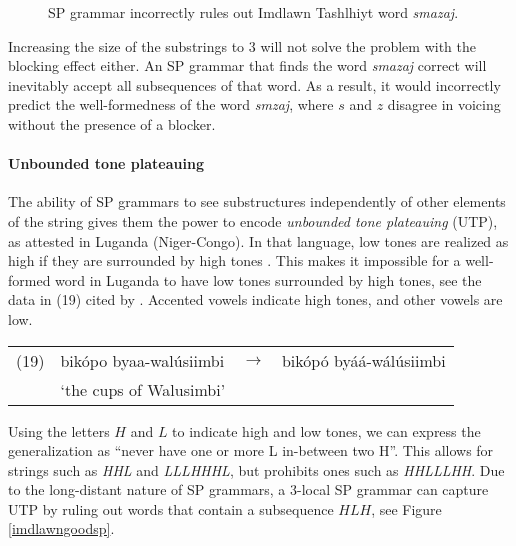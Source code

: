\begin{figure}[h!]
\begin{center}
\end{center}
\caption{SP grammar incorrectly rules out Imdlawn Tashlhiyt word \emph{sm\textchi azaj}.}
\label{imdlawnbadsp}
\end{figure}

Increasing the size of the substrings to $3$ will not solve the problem with the blocking effect either.
An SP grammar that finds the word \emph{sm\textchi azaj} correct will inevitably accept all subsequences of that word.
As a result, it would incorrectly predict the well-formedness of the word \emph{smzaj}, where $s$ and $z$ disagree in voicing without the presence of a blocker.



\paragraph{Unbounded tone plateauing}
The ability of SP grammars to see substructures independently of other elements of the string gives them the power to encode \emph{unbounded tone plateauing} (UTP), as attested in Luganda (Niger-Congo).
In that language, low tones are realized as high if they are surrounded by high tones \citep{HymanKatamba2010}.
This makes it impossible for a well-formed word in Luganda to have low tones surrounded by high tones, see the data in (19) cited by \citep{Hyman2011,Jardine2016}.
Accented vowels indicate high tones, and other vowels are low.

\medskip
\begin{tabular}{llcl}
(19) & bik\'opo byaa-wal\'usiimbi & $\rightarrow$ & bik\'op\'o by\'a\'a-w\'al\'usiimbi \\
& `the cups of Walusimbi' &&
\end{tabular}
\medskip

Using the letters $H$ and $L$ to indicate high and low tones, we can express the generalization as ``never have one or more L in-between two H''.
This allows for strings such as \emph{HHL} and \emph{LLLHHHL}, but prohibits ones such as \emph{HHLLLHH}.
Due to the long-distant nature of SP grammars, a $3$-local SP grammar can capture UTP by ruling out words that contain a subsequence $HLH$, see Figure \ref{imdlawngoodsp}.

